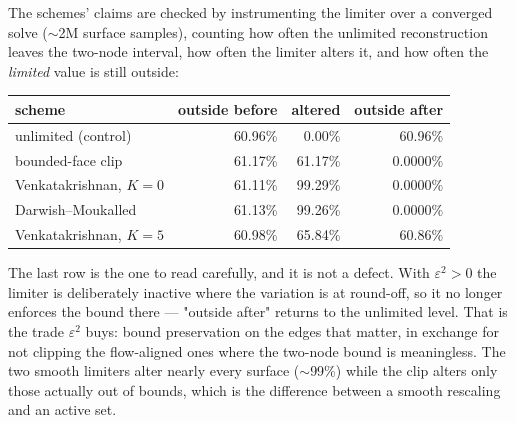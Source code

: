 The schemes' claims are checked by instrumenting the limiter over a converged solve
($\sim$2M surface samples), counting how often the unlimited reconstruction leaves the two-node
interval, how often the limiter alters it, and how often the \emph{limited} value is still
outside:

\begin{center}
\begin{tabular}{@{}lrrr@{}}
\toprule
scheme & outside before & altered & outside after \\
\midrule
unlimited (control)        & 60.96\% & \phantom{0}0.00\% & 60.96\% \\
bounded-face clip          & 61.17\% & 61.17\% & 0.0000\% \\
Venkatakrishnan, $K=0$     & 61.11\% & 99.29\% & 0.0000\% \\
Darwish--Moukalled         & 61.13\% & 99.26\% & 0.0000\% \\
Venkatakrishnan, $K=5$     & 60.98\% & 65.84\% & 60.86\% \\
\bottomrule
\end{tabular}
\end{center}

The last row is the one to read carefully, and it is not a defect. With $\varepsilon^2 > 0$ the
limiter is deliberately inactive where the variation is at round-off, so it no longer enforces the
bound there --- "outside after" returns to the unlimited level. That is the trade $\varepsilon^2$
buys: bound preservation on the edges that matter, in exchange for not clipping the flow-aligned
ones where the two-node bound is meaningless. The two smooth limiters alter nearly every surface
($\sim$99\%) while the clip alters only those actually out of bounds, which is the difference
between a smooth rescaling and an active set.
